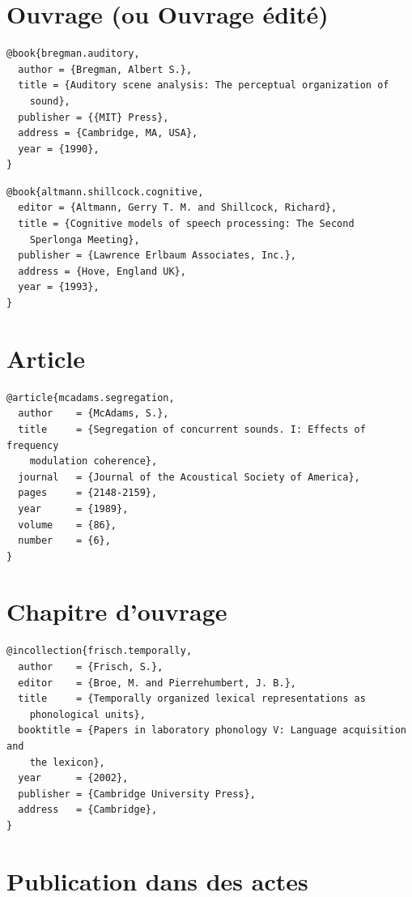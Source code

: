 \section{Ouvrage (ou Ouvrage édité)}

\vfill
\begin{verbatim}
@book{bregman.auditory,
  author = {Bregman, Albert S.},
  title = {Auditory scene analysis: The perceptual organization of
    sound},
  publisher	= {{MIT} Press},
  address = {Cambridge, MA, USA},
  year = {1990},
}
\end{verbatim}

\begin{verbatim}
@book{altmann.shillcock.cognitive,
  editor = {Altmann, Gerry T. M. and Shillcock, Richard},
  title = {Cognitive models of speech processing: The Second
    Sperlonga Meeting},
  publisher	= {Lawrence Erlbaum Associates, Inc.},
  address = {Hove, England UK},
  year = {1993},
}
\end{verbatim}
\vfill


\section{Article}

\vfill
\begin{verbatim}
@article{mcadams.segregation,
  author    = {McAdams, S.},
  title     = {Segregation of concurrent sounds. I: Effects of frequency
    modulation coherence},
  journal   = {Journal of the Acoustical Society of America},
  pages     = {2148-2159},
  year      = {1989},
  volume    = {86},
  number    = {6},
}
\end{verbatim}
\vfill


\section{Chapitre d'ouvrage}

\vfill
\begin{verbatim}
@incollection{frisch.temporally,
  author    = {Frisch, S.},
  editor    = {Broe, M. and Pierrehumbert, J. B.},
  title     = {Temporally organized lexical representations as
    phonological units},
  booktitle = {Papers in laboratory phonology V: Language acquisition and
    the lexicon},
  year      = {2002},
  publisher = {Cambridge University Press},
  address   = {Cambridge},
}
\end{verbatim}
\vfill


\section{Publication dans des actes}

